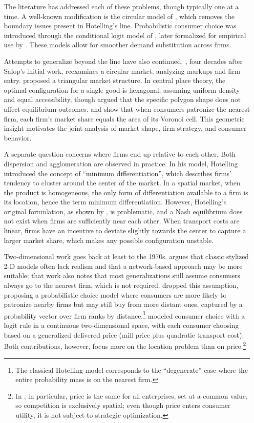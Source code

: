 \documentclass{article}
\begin{document}
The literature has addressed each of these problems, though typically one at a time.
A well-known modification is the circular model of \citet{salop1979}, which removes the boundary issues present in Hotelling's line. Probabilistic consumer choice was introduced through the conditional logit model of \citet{mcfadden1974}, later formalized for empirical use by \citet{benakiva1985}. These models allow for smoother demand substitution across firms.

Attempts to generalize beyond the line have also continued. \citet{barro2024}, four decades after Salop's initial work, reexamines a circular market, analyzing markups and firm entry. \cite{tsai2005} proposed a triangular market structure. In central place theory, the optimal configuration for a single good is hexagonal, assuming uniform density and equal accessibility, though \cite{deserpa1986} argued that the specific polygon shape does not affect equilibrium outcomes. \citet{drezner2017} and \citet{drezner2024} show that when consumers patronize the nearest firm, each firm's market share equals the area of its Voronoi cell. This geometric insight motivates the joint analysis of market shape, firm strategy, and consumer behavior.

A separate question concerns where firms end up relative to each other. Both dispersion and agglomeration are observed in practice. In his model, Hotelling introduced the concept of ``minimum differentiation'', which describes firms' tendency to cluster around the center of the market. In a spatial market, when the product is homogeneous, the only form of differentiation available to a firm is its location, hence the term minimum differentiation.
However, Hotelling's original formulation, as shown by \cite{daspremont1979hotelling}, is problematic, and a Nash equilibrium does not exist when firms are sufficiently near each other. When transport costs are linear, firms have an incentive to deviate slightly towards the center to capture a larger market share, which makes any possible configuration unstable.

Two-dimensional work goes back at least to the 1970s. \citet{cahan2021} argues that classic stylized 2-D models often lack realism and that a network-based approach may be more suitable; that work also notes that most generalizations still assume consumers always go to the nearest firm, which is not required. \citet{cox1987} dropped this assumption, proposing a probabilistic choice model where consumers are more likely to patronize nearby firms but may still buy from more distant ones, captured by a probability vector over firm ranks by distance.\footnote{The classical Hotelling model corresponds to the ``degenerate'' case where the entire probability mass is on the nearest firm.} \citet{larralde2009} modeled consumer choice with a logit rule in a continuous two-dimensional space, with each consumer choosing based on a generalized delivered price (mill price plus quadratic transport cost). Both contributions, however, focus more on the location problem than on price.\footnote{In \citet{larralde2009}, in particular, price is the same for all enterprises, set at a common value, so competition is exclusively spatial; even though price enters consumer utility, it is not subject to strategic optimization.}
\end{document}
